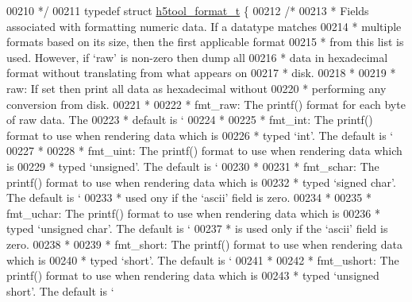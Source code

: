 \begin{DoxyCode}
{00210 \textcolor{comment}{ */}
00211 \textcolor{keyword}{typedef} \textcolor{keyword}{struct }\hyperlink{structh5tool__format__t}{h5tool\_format\_t} \{
00212     \textcolor{comment}{/*}
00213 \textcolor{comment}{     * Fields associated with formatting numeric data.  If a datatype matches}
00214 \textcolor{comment}{     * multiple formats based on its size, then the first applicable format}
00215 \textcolor{comment}{     * from this list is used. However, if `raw' is non-zero then dump all}
00216 \textcolor{comment}{     * data in hexadecimal format without translating from what appears on}
00217 \textcolor{comment}{     * disk.}
00218 \textcolor{comment}{     *}
00219 \textcolor{comment}{     *   raw:        If set then print all data as hexadecimal without}
00220 \textcolor{comment}{     *               performing any conversion from disk.}
00221 \textcolor{comment}{     *}
00222 \textcolor{comment}{     *   fmt\_raw:    The printf() format for each byte of raw data. The}
00223 \textcolor{comment}{     *               default is `%
00224 \textcolor{comment}{     *}
00225 \textcolor{comment}{     *   fmt\_int:    The printf() format to use when rendering data which is}
00226 \textcolor{comment}{     *               typed `int'. The default is `%
00227 \textcolor{comment}{     *}
00228 \textcolor{comment}{     *   fmt\_uint:   The printf() format to use when rendering data which is}
00229 \textcolor{comment}{     *               typed `unsigned'. The default is `%
00230 \textcolor{comment}{     *}
00231 \textcolor{comment}{     *   fmt\_schar:  The printf() format to use when rendering data which is}
00232 \textcolor{comment}{     *               typed `signed char'. The default is `%
00233 \textcolor{comment}{     *               used ony if the `ascii' field is zero.}
00234 \textcolor{comment}{     *}
00235 \textcolor{comment}{     *   fmt\_uchar:  The printf() format to use when rendering data which is}
00236 \textcolor{comment}{     *               typed `unsigned char'. The default is `%
00237 \textcolor{comment}{     *               is used only if the `ascii' field is zero.}
00238 \textcolor{comment}{     *}
00239 \textcolor{comment}{     *   fmt\_short:  The printf() format to use when rendering data which is}
00240 \textcolor{comment}{     *               typed `short'. The default is `%
00241 \textcolor{comment}{     *}
00242 \textcolor{comment}{     *   fmt\_ushort: The printf() format to use when rendering data which is}
00243 \textcolor{comment}{     *               typed `unsigned short'. The default is `%
}}}}}}}}
\end{DoxyCode}
